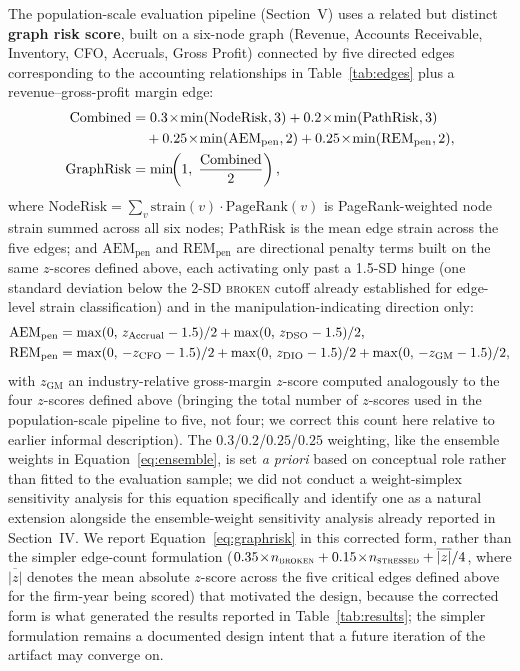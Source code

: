 \documentclass[12pt]{article}
\begin{document}
The population-scale evaluation pipeline (Section~V) uses a related but
distinct \textbf{graph risk score}, built on a six-node graph (Revenue,
Accounts Receivable, Inventory, CFO, Accruals, Gross Profit) connected by
five directed edges corresponding to the accounting relationships in
Table~\ref{tab:edges} plus a revenue--gross-profit margin edge:
\begin{align}
    \text{Combined} &= 0.3\!\times\!\min(\text{NodeRisk},3)
      + 0.2\!\times\!\min(\text{PathRisk},3) \notag \\
     &\quad+ 0.25\!\times\!\min(\text{AEM}_{\text{pen}},2)
      + 0.25\!\times\!\min(\text{REM}_{\text{pen}},2), \notag \\
    \text{GraphRisk} &= \min\!\!\left(1,\;\frac{\text{Combined}}{2}\right),
    \label{eq:graphrisk}
\end{align}
where $\text{NodeRisk} = \sum_{v} \text{strain}(v)\cdot\text{PageRank}(v)$
is PageRank-weighted node strain summed across all six nodes;
$\text{PathRisk}$ is the mean edge strain across the five edges; and
$\text{AEM}_{\text{pen}}$ and $\text{REM}_{\text{pen}}$ are directional
penalty terms built on the same $z$-scores defined above, each
activating only past a 1.5-SD hinge (one standard deviation below the
2-SD \textsc{broken} cutoff already established for edge-level strain
classification) and in the manipulation-indicating direction only:
\begin{align}
    \text{AEM}_{\text{pen}} &= \max(0,\,z_{\text{Accrual}}-1.5)/2 + \max(0,\,z_{\text{DSO}}-1.5)/2, \notag \\
    \text{REM}_{\text{pen}} &= \max(0,\,-z_{\text{CFO}}-1.5)/2 + \max(0,\,z_{\text{DIO}}-1.5)/2 + \max(0,\,-z_{\text{GM}}-1.5)/2, \notag
\end{align}
with $z_{\text{GM}}$ an industry-relative gross-margin $z$-score computed
analogously to the four $z$-scores defined above (bringing the total
number of $z$-scores used in the population-scale pipeline to five,
not four; we correct this count here relative to earlier informal
description).  The $0.3$/$0.2$/$0.25$/$0.25$ weighting, like the
ensemble weights in Equation~\eqref{eq:ensemble}, is set \textit{a
priori} based on conceptual role rather than fitted to the evaluation
sample; we did not conduct a weight-simplex sensitivity analysis for
this equation specifically and identify one as a natural extension
alongside the ensemble-weight sensitivity analysis already reported in
Section~IV.  We report Equation~\eqref{eq:graphrisk} in this corrected
form, rather than the simpler edge-count formulation
($0.35\!\times\!n_{\textsc{broken}} + 0.15\!\times\!n_{\textsc{stressed}}
+ \overline{|z|}/4$, where $\overline{|z|}$ denotes the mean absolute
$z$-score across the five critical edges defined above for the
firm-year being scored) that motivated the design, because the corrected
form is what generated the results reported in
Table~\ref{tab:results}; the simpler formulation remains a documented
design intent that a future iteration of the artifact may converge on.
\end{document}
